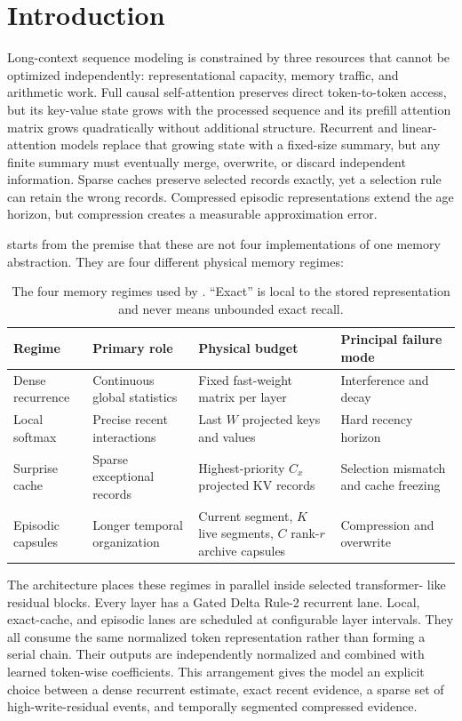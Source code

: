 \section{Introduction}
\label{sec:introduction}

Long-context sequence modeling is constrained by three resources that cannot
be optimized independently: representational capacity, memory traffic, and
arithmetic work. Full causal self-attention preserves direct token-to-token
access, but its key-value state grows with the processed sequence and its
prefill attention matrix grows quadratically without additional structure.
Recurrent and linear-attention models replace that growing state with a
fixed-size summary, but any finite summary must eventually merge, overwrite,
or discard independent information. Sparse caches preserve selected records
exactly, yet a selection rule can retain the wrong records. Compressed
episodic representations extend the age horizon, but compression creates a
measurable approximation error.

\ALUCLU starts from the premise that these are not four implementations of one
memory abstraction. They are four different physical memory regimes:

\begin{table}[h]
\centering
\caption{The four memory regimes used by \ALUCLU. ``Exact'' is local to the
stored representation and never means unbounded exact recall.}
\label{tab:memory-regimes}
\begin{tabularx}{\textwidth}{@{}p{}p{}
  p{}X@{}}
\toprule
Regime & Primary role & Physical budget & Principal failure mode \\
\midrule
Dense recurrence & Continuous global statistics & Fixed fast-weight matrix
per layer & Interference and decay \\
Local softmax & Precise recent interactions & Last \(W\) projected keys and
values & Hard recency horizon \\
Surprise cache & Sparse exceptional records & Highest-priority \(C_x\)
projected KV records & Selection mismatch and cache freezing \\
Episodic capsules & Longer temporal organization & Current segment, \(K\)
live segments, \(C\) rank-\(r\) archive capsules & Compression and overwrite \\
\bottomrule
\end{tabularx}
\end{table}

The architecture places these regimes in parallel inside selected transformer-
like residual blocks. Every layer has a Gated Delta Rule-2 recurrent lane.
Local, exact-cache, and episodic lanes are scheduled at configurable layer
intervals. They all consume the same normalized token representation rather
than forming a serial chain. Their outputs are independently normalized and
combined with learned token-wise coefficients. This arrangement gives the
model an explicit choice between a dense recurrent estimate, exact recent
evidence, a sparse set of high-write-residual events, and temporally segmented
compressed evidence.


